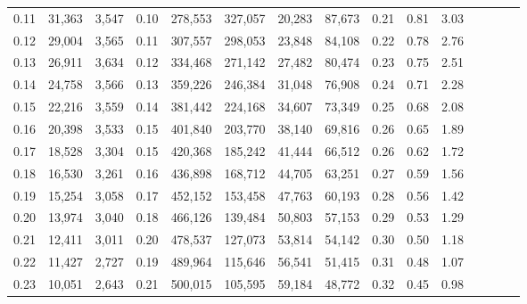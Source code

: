 \begin{tabular}{rrrcrrrrrrrrrrr}
0.11 &  31,363 &  3,547 &                                       0.10 &  278,553 &  327,057 &   20,283 &   87,673 &  0.21 &  0.81 &                         3.03 \\
0.12 &  29,004 &  3,565 &                                       0.11 &  307,557 &  298,053 &   23,848 &   84,108 &  0.22 &  0.78 &                         2.76 \\
0.13 &  26,911 &  3,634 &                                       0.12 &  334,468 &  271,142 &   27,482 &   80,474 &  0.23 &  0.75 &                         2.51 \\
0.14 &  24,758 &  3,566 &                                       0.13 &  359,226 &  246,384 &   31,048 &   76,908 &  0.24 &  0.71 &                         2.28 \\
0.15 &  22,216 &  3,559 &                                       0.14 &  381,442 &  224,168 &   34,607 &   73,349 &  0.25 &  0.68 &                         2.08 \\
0.16 &  20,398 &  3,533 &                                       0.15 &  401,840 &  203,770 &   38,140 &   69,816 &  0.26 &  0.65 &                         1.89 \\
0.17 &  18,528 &  3,304 &                                       0.15 &  420,368 &  185,242 &   41,444 &   66,512 &  0.26 &  0.62 &                         1.72 \\
0.18 &  16,530 &  3,261 &                                       0.16 &  436,898 &  168,712 &   44,705 &   63,251 &  0.27 &  0.59 &                         1.56 \\
0.19 &  15,254 &  3,058 &                                       0.17 &  452,152 &  153,458 &   47,763 &   60,193 &  0.28 &  0.56 &                         1.42 \\
0.20 &  13,974 &  3,040 &                                       0.18 &  466,126 &  139,484 &   50,803 &   57,153 &  0.29 &  0.53 &                         1.29 \\
0.21 &  12,411 &  3,011 &                                       0.20 &  478,537 &  127,073 &   53,814 &   54,142 &  0.30 &  0.50 &                         1.18 \\
0.22 &  11,427 &  2,727 &                                       0.19 &  489,964 &  115,646 &   56,541 &   51,415 &  0.31 &  0.48 &                         1.07 \\
0.23 &  10,051 &  2,643 &                                       0.21 &  500,015 &  105,595 &   59,184 &   48,772 &  0.32 &  0.45 &                         0.98 \\

\end{tabular}
